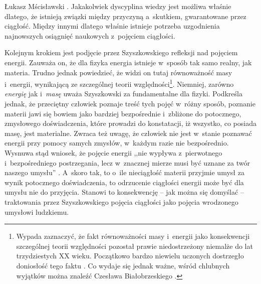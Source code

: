 \begin{artplenv}{Łukasz Mścisławski}
\parencite[][s.~47]{szyszkowski_o_1916}. %
 Jakakolwiek dyscyplina wiedzy jest możliwa właśnie dlatego, że istnieją związki między przyczyną a~skutkiem, gwarantowane przez ciągłość. Między innymi dlatego właśnie istnieje potrzeba uzgodnienia najnowszych osiągnięć naukowych z~pojęciem ciągłości.


Kolejnym krokiem jest podjęcie przez Szyszkowskiego refleksji nad pojęciem energii. Zauważa on, że dla fizyka energia istnieje w~sposób tak samo realny, jak materia. Trudno jednak powiedzieć, że widzi on tutaj równoważność masy i~energii, wynikającą ze szczególnej teorii względności\footnote{Wypada zaznaczyć, że fakt równoważności masy i~energii jako konsekwencji szczególnej teorii względności pozostał prawie niedostrzeżony niemalże do lat trzydziestych XX wieku. Początkowo bardzo niewielu uczonych dostrzegło doniosłość tego faktu
\parencite[por. zwłaszcza][s.~149–159]{pais_subtle_2005}. %
 Co wydaje się jednak ważne, wśród chlubnych wyjątków można znaleźć Czesława Białobrzeskiego 
\parencite*[][s.~15–17]{bialobrzeski_zasada_1911}.%
}. Niemniej, zarówno \textit{energię} jak i~\textit{masę} uważa Szyszkowski za fundamentalne dla fizyki. Podkreśla jednak, że przeciętny człowiek poznaje treść tych pojęć w~różny sposób, poznanie materii jawi się bowiem jako bardziej bezpośrednie i~zbliżone do potocznego, zmysłowego doświadczenia, które prowadzi do konstatacji, iż wszystko, co posiada masę, jest materialne. Zwraca też uwagę, że człowiek nie jest w~stanie poznawać energii przy pomocy samych zmysłów, w~każdym razie nie bezpośrednio. Wysnuwa stąd wniosek, że pojęcie energii ,,nie wypływa z~pierwotnego i~bezpośredniego postrzegania, lecz w~znacznej mierze musi być uznane za twór naszego umysłu'' 
\parencite[][s.~48]{szyszkowski_o_1916}. %
 A~skoro tak, to o~ile nieciągłość materii przyjmie umysł za wynik potocznego doświadczenia, to odrzucenie ciągłości energii może być dla umysłu nie do przyjęcia. Stanowi to konsekwencję -- jak można się domyślać -- traktowania przez Szyszkowskiego pojęcia ciągłości jako pojęcia wrodzonego umysłowi ludzkiemu.



\end{artplenv}
